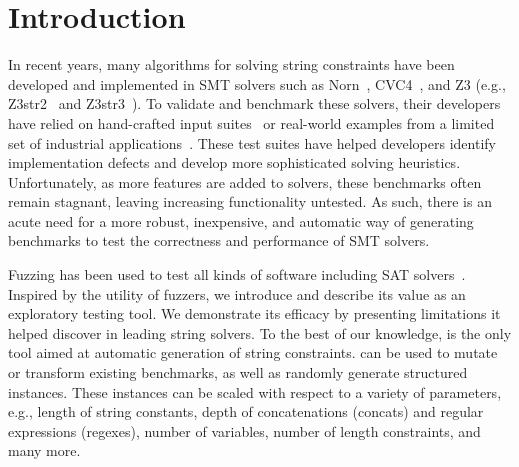 \section{Introduction}

In recent years, many algorithms for solving string constraints have
been developed and implemented in SMT solvers such as
Norn~\cite{norn}, CVC4~\cite{cvc4}, and Z3 (e.g., Z3str2~\cite{z3str2}
and Z3str3~\cite{z3str3}).  To validate and benchmark these solvers,
their developers have relied on hand-crafted input
suites~\cite{cvc4-tests,z3str3-tests,z3str2-tests} or real-world
examples from a limited set of industrial
applications~\cite{kaluza,kausler}. These test suites have helped
developers identify implementation defects and develop more
sophisticated solving heuristics. Unfortunately, as more features are
added to solvers, these benchmarks often remain stagnant, leaving
increasing functionality untested.  As such, there is an acute need
for a more robust, inexpensive, and automatic way of generating
benchmarks to test the correctness and performance of SMT solvers.

Fuzzing has been used to test all kinds of software including SAT
solvers~\cite{fuzzsat}. Inspired by the utility of fuzzers, we
introduce \fuzzer{} and describe its value as an exploratory testing
tool. We demonstrate its efficacy by presenting limitations it helped
discover in leading string solvers. To the best of our knowledge,
\fuzzer{} is the only tool aimed at automatic generation of string
constraints. \fuzzer{} can be used to mutate or transform existing
benchmarks, as well as randomly generate structured instances. These
instances can be scaled with respect to a variety of parameters, e.g.,
length of string constants, depth of concatenations (concats) and
regular expressions (regexes), number of variables, number of length
constraints, and many more.

\newpage
